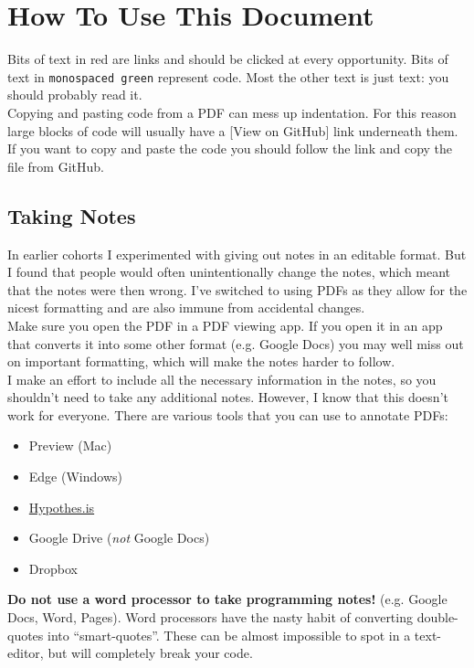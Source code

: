 \newpage

\section*{How To Use This Document}

Bits of text in \textcolor{dm-red}{red} are links and should be clicked at every opportunity. Bits of text in \texttt{monospaced green} represent code. Most the other text is just text: you should probably read it.
\\

Copying and pasting code from a PDF can mess up indentation. For this reason large blocks of code will usually have a [\textcolor{dm-red}{View on GitHub}] link underneath them. If you want to copy and paste the code you should follow the link and copy the file from GitHub.


\subsection*{Taking Notes}

In earlier cohorts I experimented with giving out notes in an editable format. But I found that people would often unintentionally change the notes, which meant that the notes were then wrong. I've switched to using PDFs as they allow for the nicest formatting and are also immune from accidental changes.
\\

Make sure you open the PDF in a PDF viewing app. If you open it in an app that converts it into some other format (e.g. Google Docs) you may well miss out on important formatting, which will make the notes harder to follow.
\\

I make an effort to include all the necessary information in the notes, so you shouldn't need to take any additional notes. However, I know that this doesn't work for everyone. There are various tools that you can use to annotate PDFs:

\begin{itemize}
    \item Preview (Mac)
    \item Edge (Windows)
    \item \href{https://web.hypothes.is/quick-start-guide-for-students/}{Hypothes.is}
    \item Google Drive (\textit{not} Google Docs)
    \item Dropbox
\end{itemize}

\textbf{Do not use a word processor to take programming notes!} (e.g. Google Docs, Word, Pages). Word processors have the nasty habit of converting double-quotes into ``smart-quotes''. These can be almost impossible to spot in a text-editor, but will completely break your code.
